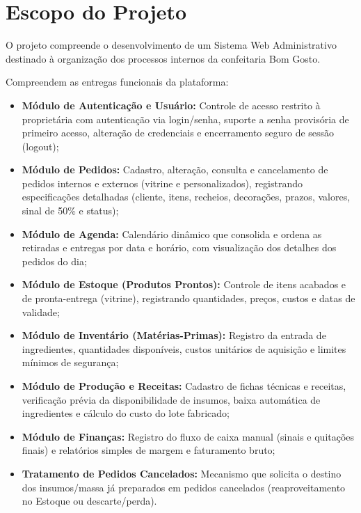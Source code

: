 \section{Escopo do Projeto}
O projeto compreende o desenvolvimento de um Sistema Web Administrativo destinado à organização dos processos internos da confeitaria Bom Gosto.

Compreendem as entregas funcionais da plataforma:
\begin{itemize}
    \item \textbf{Módulo de Autenticação e Usuário:} Controle de acesso restrito à proprietária com autenticação via login/senha, suporte a senha provisória de primeiro acesso, alteração de credenciais e encerramento seguro de sessão (logout);
    \item \textbf{Módulo de Pedidos:} Cadastro, alteração, consulta e cancelamento de pedidos internos e externos (vitrine e personalizados), registrando especificações detalhadas (cliente, itens, recheios, decorações, prazos, valores, sinal de 50\% e status);
    \item \textbf{Módulo de Agenda:} Calendário dinâmico que consolida e ordena as retiradas e entregas por data e horário, com visualização dos detalhes dos pedidos do dia;
    \item \textbf{Módulo de Estoque (Produtos Prontos):} Controle de itens acabados e de pronta-entrega (vitrine), registrando quantidades, preços, custos e datas de validade;
    \item \textbf{Módulo de Inventário (Matérias-Primas):} Registro da entrada de ingredientes, quantidades disponíveis, custos unitários de aquisição e limites mínimos de segurança;
    \item \textbf{Módulo de Produção e Receitas:} Cadastro de fichas técnicas e receitas, verificação prévia da disponibilidade de insumos, baixa automática de ingredientes e cálculo do custo do lote fabricado;
    \item \textbf{Módulo de Finanças:} Registro do fluxo de caixa manual (sinais e quitações finais) e relatórios simples de margem e faturamento bruto;
    \item \textbf{Tratamento de Pedidos Cancelados:} Mecanismo que solicita o destino dos insumos/massa já preparados em pedidos cancelados (reaproveitamento no Estoque ou descarte/perda).
\end{itemize}

